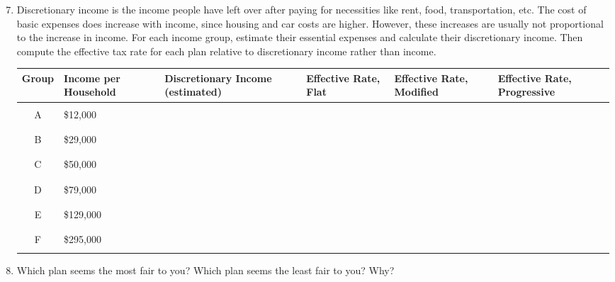 \begin{exercises}
\begin{minipage}[t]{\textwidth}
\begin{enumerate}[1)]
\setcounter{enumi}{6}
\item Discretionary income is the income people have left over after paying for necessities like rent, food, transportation, etc.  The cost of basic expenses does increase with income, since housing and car costs are higher.  However, these increases are usually not proportional to the increase in income.  For each income group, estimate their essential expenses and calculate their discretionary income.  Then compute the effective tax rate for each plan relative to discretionary income rather than income.
\begin{center}
\begin{tabular}{|c | p{0.75in} | p{1.3in} | p{0.75in} | p{1in} | p{1in} |}
\hline
Group & Income per Household & Discretionary Income (estimated) & Effective Rate, Flat & Effective Rate, Modified & Effective Rate, Progressive\\
\hline
& & & & & \\
A & \$12,000 & & & & \\
& & & & & \\
\hline
& & & & & \\
B & \$29,000 & & & & \\
& & & & & \\
\hline
& & & & & \\
C & \$50,000 & & & & \\
& & & & & \\
\hline
& & & & & \\
D & \$79,000 & & & & \\
& & & & & \\
\hline
& & & & & \\
E & \$129,000 & & & & \\
& & & & & \\
\hline
& & & & & \\
F & \$295,000 & & & & \\
& & & & & \\
\hline
\end{tabular}
\end{center}

\item Which plan seems the most fair to you?  Which plan seems the least fair to you?  Why?
\end{enumerate}
\end{minipage}
\end{exercises}